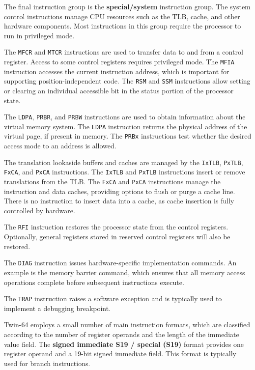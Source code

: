 
The final instruction group is the \textbf{special/system} instruction group. The system control instructions manage CPU resources such as the TLB, cache, and other hardware components. Most instructions in this group require the processor to run in privileged mode.  

The \texttt{MFCR} and \texttt{MTCR} instructions are used to transfer data to and from a control register. Access to some control registers requires privileged mode. The \texttt{MFIA} instruction accesses the current instruction address, which is important for supporting position-independent code. The \texttt{RSM} and \texttt{SSM} instructions allow setting or clearing an individual accessible bit in the status portion of the processor state.  

The \texttt{LDPA}, \texttt{PRBR}, and \texttt{PRBW} instructions are used to obtain information about the virtual memory system. The \texttt{LDPA} instruction returns the physical address of the virtual page, if present in memory. The \texttt{PRBx} instructions test whether the desired access mode to an address is allowed.  

The translation lookaside buffers and caches are managed by the \texttt{IxTLB}, \texttt{PxTLB}, \texttt{FxCA}, and \texttt{PxCA} instructions. The \texttt{IxTLB} and \texttt{PxTLB} instructions insert or remove translations from the TLB. The \texttt{FxCA} and \texttt{PxCA} instructions manage the instruction and data caches, providing options to flush or purge a cache line. There is no instruction to insert data into a cache, as cache insertion is fully controlled by hardware.  

The \texttt{RFI} instruction restores the processor state from the control registers. Optionally, general registers stored in reserved control registers will also be restored.  

The \texttt{DIAG} instruction issues hardware-specific implementation commands. An example is the memory barrier command, which ensures that all memory access operations complete before subsequent instructions execute.  

The \texttt{TRAP} instruction raises a software exception and is typically used to implement a debugging breakpoint.


Twin-64 employs a small number of main instruction formats, which are classified according to the number of register operands and the length of the immediate value field. The \textbf{signed immediate S19 / special (S19)} format provides one register operand and a 19-bit signed immediate field. This format is typically used for branch instructions.


